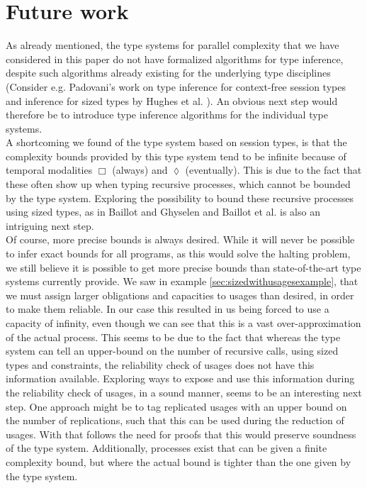 \section{Future work}

As already mentioned, the type systems for parallel complexity that we have considered in this paper do not have formalized algorithms for type inference, despite such algorithms already existing for the underlying type disciplines (Consider e.g. Padovani's work on type inference for context-free session types \cite{Padovani2017} and inference for sized types by Hughes et al. \cite{HughesEtAl1996}). An obvious next step would therefore be to introduce type inference algorithms for the individual type systems.\\%

A shortcoming we found of the type system based on session types, is that the complexity bounds provided by this type system tend to be infinite because of temporal modalities $\Box$ (always) and $\lozenge$ (eventually). This is due to the fact that these often show up when typing recursive processes, which cannot be bounded by the type system. Exploring the possibility to bound these recursive processes using sized types, as in Baillot and Ghyselen \cite{BaillotGhyselen2021} and Baillot et al. \cite{BaillotEtAl2021} is also an intriguing next step.\\

Of course, more precise bounds is always desired. While it will never be possible to infer exact bounds for all programs, as this would solve the halting problem, we still believe it is possible to get more precise bounds than state-of-the-art type systems currently provide. We saw in example \ref{sec:sizedwithusagesexample}, that we must assign larger obligations and capacities to usages than desired, in order to make them reliable. In our case this resulted in us being forced to use a capacity of infinity, even though we can see that this is a vast over-approximation of the actual process. This seems to be due to the fact that whereas the type system can tell an upper-bound on the number of recursive calls, using sized types and constraints, the reliability check of usages does not have this information available. Exploring ways to expose and use this information during the reliability check of usages, in a sound manner, seems to be an interesting next step. One approach might be to tag replicated usages with an upper bound on the number of replications, such that this can be used during the reduction of usages. With that follows the need for proofs that this would preserve soundness of the type system. Additionally, processes exist that can be given a finite complexity bound, but where the actual bound is tighter than the one given by the type system.\\

